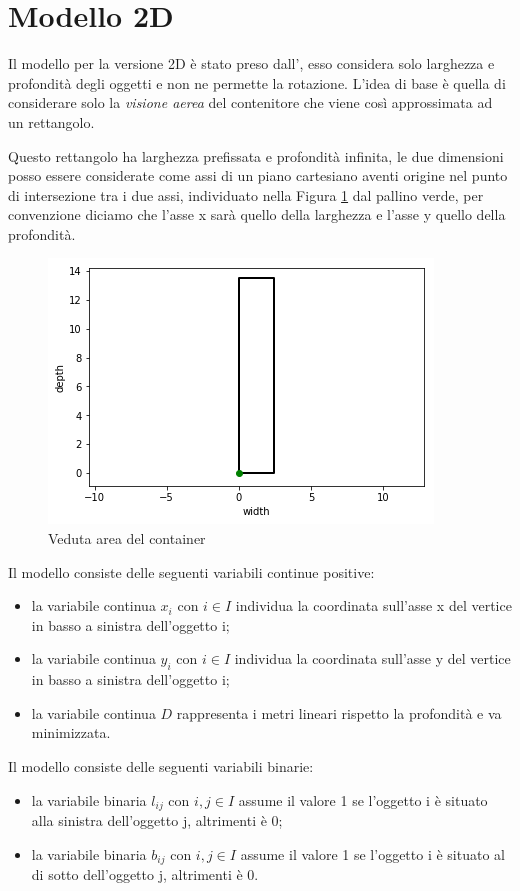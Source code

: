 \section{Modello 2D}
Il modello per la versione 2D è stato preso dall', esso considera solo larghezza e profondità degli oggetti e non ne permette la rotazione. L'idea di base è quella di considerare solo la \textit{visione aerea} del contenitore che viene così approssimata ad un rettangolo.

Questo rettangolo ha larghezza prefissata e profondità infinita, le due dimensioni posso essere considerate come assi di un piano cartesiano aventi origine nel punto di intersezione tra i due assi, individuato nella Figura \ref{fig:veduta_aerea} dal pallino verde, per convenzione diciamo che l'asse x sarà quello della larghezza e l'asse y quello della profondità.
\begin{figure}[H]
	\begin{center} \includegraphics[scale=0.6]{figures/cartesian_wd}
		\caption[Veduta area - piano cartesiano]{Veduta area del container}  
		\label{fig:veduta_aerea}
	\end{center}
\end{figure}

\noindent Il modello consiste delle seguenti variabili continue positive:
\begin{itemize}
	\item la variabile continua $x_{i}$ con $i \in I$ individua la coordinata sull'asse x del vertice in basso a sinistra dell'oggetto i;
	\item la variabile continua $y_{i}$ con $i \in I$ individua la coordinata sull'asse y del vertice in basso a sinistra dell'oggetto i;
	\item la variabile continua $D$ rappresenta i metri lineari rispetto la profondità e va minimizzata.
\end{itemize}
Il modello consiste delle seguenti variabili binarie:
\begin{itemize}
	\item la variabile binaria $l_{ij}$ con $i,j \in I$ assume il valore 1 se l'oggetto i è situato alla sinistra dell'oggetto j, altrimenti è 0;
	\item la variabile binaria $b_{ij}$ con $i,j \in I$ assume il valore 1 se l'oggetto i è situato al di sotto dell'oggetto j, altrimenti è 0.
\end{itemize}

